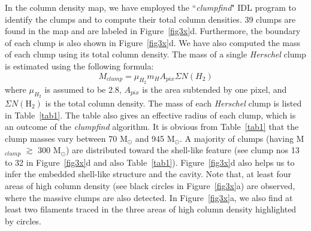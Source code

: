\documentclass[iop]{emulateapj}
\begin{document}
In the column density map, we have employed the ``{\it clumpfind}" IDL program \citep{williams94} to identify the clumps and 
to compute their total column densities. 
39 clumps are found in the map and are labeled in Figure~\ref{fig3x}d. 
Furthermore, the boundary of each clump is also shown in Figure~\ref{fig3x}d. 
We have also computed the mass of each clump using its total column density. 
The mass of a single {\it Herschel} clump is estimated using the following formula:
\begin{equation}
M_{clump} = \mu_{H_2} m_H A_{pix} \Sigma N(H_2)
\end{equation}
where $\mu_{H_2}$ is assumed to be 2.8, $A_{pix}$ is the area subtended by one pixel, and 
$\Sigma N(\mathrm H_2)$ is the total column density. 
The mass of each {\it Herschel} clump is listed in Table~\ref{tab1}. 
The table also gives an effective radius of each clump, which is an outcome of the {\it clumpfind} algorithm. 
It is obvious from Table~\ref{tab1} that the clump masses vary between 70 M$_{\odot}$ and 945 M$_{\odot}$. 
A majority of clumps (having M$_{clump}$ $\gtrsim$ 300 M$_{\odot}$) are distributed toward the shell-like feature 
(see clump nos 13 to 32 in Figure~\ref{fig3x}d and also Table~\ref{tab1}). 
Figure~\ref{fig3x}d also helps us to infer the embedded shell-like structure and the cavity. 
Note that, at least four areas of high column density (see black circles in Figure~\ref{fig3x}a) 
are observed, where the massive clumps are also detected. 
In Figure~\ref{fig3x}a, we also find at least two filaments traced in the three areas of high column density highlighted by circles.
\end{document}
